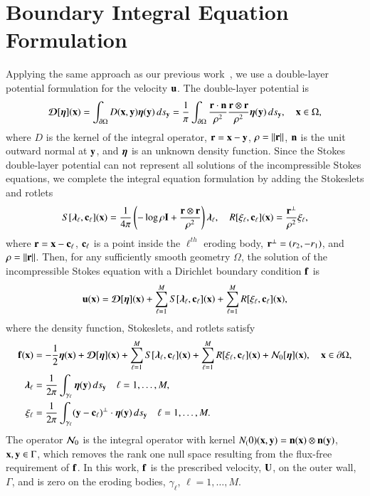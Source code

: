 \documentclass[preprint, 10pt]{elsarticle}
\begin{document}
\section{Boundary Integral Equation Formulation}
\label{sec:DLP}
Applying the same approach as our previous work~\cite{qua-moo2018}, we
use a double-layer potential formulation for the velocity ${\mathbf{u}}$.  The
double-layer potential is
\begin{align}
  {\boldsymbol{\mathcal D}}[{\boldsymbol\eta}]({\mathbf{x}}) = \int_{{\partial}\Omega} D({\mathbf{x}},{\mathbf{y}}) {\boldsymbol\eta}({\mathbf{y}})\, ds_{\mathbf{y}} = 
  \frac{1}{\pi}\int_{{\partial}\Omega} 
    \frac{{\mathbf{r}} \cdot {\mathbf{n}}}{\rho^2} \frac{{\mathbf{r}} \otimes {\mathbf{r}}}{\rho^2}
    {\boldsymbol\eta}({\mathbf{y}}) \, ds_{\mathbf{y}}, \quad {\mathbf{x}} \in \Omega,
  \label{eqn:velocityDLP}
\end{align}
where $D$ is the kernel of the integral operator, ${\mathbf{r}} = {\mathbf{x}} - {\mathbf{y}}$,
$\rho = \|{\mathbf{r}}\|$, ${\mathbf{n}}$ is the unit outward normal at ${\mathbf{y}}$, and ${\boldsymbol\eta}$
is an unknown density function.  Since the Stokes double-layer potential
can not represent all solutions of the incompressible Stokes equations,
we complete the integral equation formulation by adding the Stokeslets
and rotlets~\cite{pow-mir1987}
\begin{align}
  S[{\boldsymbol\lambda}_\ell,{\mathbf{c}}_\ell]({\mathbf{x}}) = \frac{1}{4\pi} \left( 
    -\log \rho {\mathbf{I}} + \frac{{\mathbf{r}} \otimes {\mathbf{r}}}{\rho^2}
    \right){\boldsymbol\lambda}_\ell, \quad
  R[\xi_\ell,{\mathbf{c}}_\ell]({\mathbf{x}}) = \frac{{\mathbf{r}}^\perp}{\rho^2} \xi_\ell,
\end{align}
where ${\mathbf{r}} = {\mathbf{x}} - {\mathbf{c}}_\ell$, ${\mathbf{c}}_\ell$ is a point inside the
$\ell^{th}$ eroding body, ${\mathbf{r}}^\perp = (r_2,-r_1)$, and $\rho =
\|{\mathbf{r}}\|$.  Then, for any sufficiently smooth geometry $\Omega$, the
solution of the incompressible Stokes equation with a Dirichlet boundary
condition ${\mathbf{f}}$ is
\begin{align}
  {\mathbf{u}}({\mathbf{x}}) = {\boldsymbol{\mathcal D}}[{\boldsymbol\eta}]({\mathbf{x}}) + 
    \sum_{\ell=1}^M S[{\boldsymbol\lambda}_\ell,{\mathbf{c}}_\ell]({\mathbf{x}}) + 
    \sum_{\ell=1}^M R[\xi_\ell,{\mathbf{c}}_\ell]({\mathbf{x}}),
\end{align}
where the density function, Stokeslets, and rotlets satisfy
\begin{subequations}
\label{eqn:BIE}
\begin{align}
  {\mathbf{f}}({\mathbf{x}}) &= -\frac{1}{2}{\boldsymbol\eta}({\mathbf{x}}) + {\boldsymbol{\mathcal D}}[{\boldsymbol\eta}]({\mathbf{x}}) + 
    \sum_{\ell=1}^M S[{\boldsymbol\lambda}_\ell,{\mathbf{c}}_\ell]({\mathbf{x}}) + 
    \sum_{\ell=1}^M R[\xi_\ell,{\mathbf{c}}_\ell]({\mathbf{x}}) +
    {\mathcal{N}}_0[{\boldsymbol\eta}]({\mathbf{x}}), \quad {\mathbf{x}} \in {\partial}\Omega, \\
  {\boldsymbol\lambda}_\ell &= \frac{1}{2\pi} \int_{\gamma_\ell} 
    {\boldsymbol\eta}({\mathbf{y}})\, ds_{\mathbf{y}} \quad \ell = 1,\ldots,M, \\
  \xi_\ell &= \frac{1}{2\pi} \int_{\gamma_\ell}
    ({\mathbf{y}} - {\mathbf{c}}_\ell)^\perp \cdot {\boldsymbol\eta}({\mathbf{y}})\, ds_{\mathbf{y}} 
    \quad \ell = 1,\ldots,M.
\end{align}
\end{subequations}
The operator ${\mathcal{N}}_0$ is the integral operator with kernel
$N_(0)({\mathbf{x}},{\mathbf{y}}) = {\mathbf{n}}({\mathbf{x}}) \otimes {\mathbf{n}}({\mathbf{y}})$, ${\mathbf{x}},{\mathbf{y}} \in \Gamma$,
which removes the rank one null space resulting from the flux-free
requirement of ${\mathbf{f}}$.  In this work, ${\mathbf{f}}$ is the prescribed velocity,
${\mathbf{U}}$, on the outer wall, $\Gamma$, and is zero on the eroding bodies,
$\gamma_\ell$, $\ell=1,\ldots,M$.  
\end{document}
